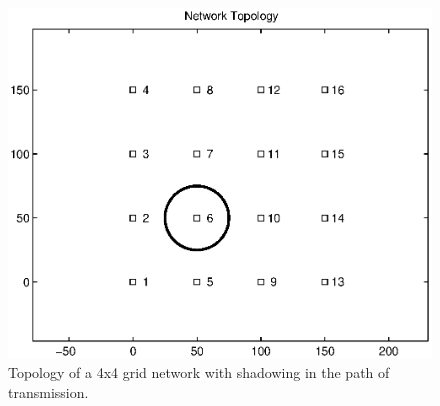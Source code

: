 \begin{figure}
\includegraphics[scale=.6]{figures/4x4topology_shadowing}
\caption{Topology of a 4x4 grid network with shadowing in the path of transmission.}
\label{fig:4x4topologyshadowing}
\end{figure}